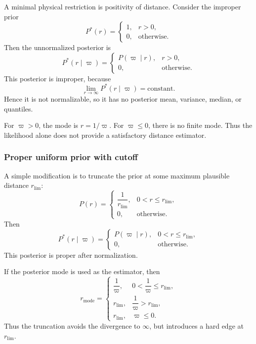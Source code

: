 \documentclass[11pt, titlepage]{article} %
\numberwithin{equation}{section}
\theoremstyle{definition}
\numberwithin{assumption}{section}
\begin{document}
A minimal physical restriction is positivity of distance. Consider the improper prior
\begin{equation*}
    P^*(r)=
    \begin{cases}
        1, & r>0,\\
        0, & \text{otherwise}.
    \end{cases}
\end{equation*}
Then the unnormalized posterior is
\begin{equation*}
    P^*(r\mid \varpi)=
    \begin{cases}
        P(\varpi\mid r), & r>0,\\
        0, & \text{otherwise}.
    \end{cases}
\end{equation*}
This posterior is improper, because
\begin{equation*}
    \lim_{r\to\infty} P^*(r\mid \varpi)=\text{constant}.
\end{equation*}
Hence it is not normalizable, so it has no posterior mean, variance, median, or quantiles.

For $\varpi>0$, the mode is $r=1/\varpi$. For $\varpi\le 0$, there is no finite mode. Thus the likelihood alone does not provide a satisfactory distance estimator.

\subsubsection*{Proper uniform prior with cutoff}

A simple modification is to truncate the prior at some maximum plausible distance $r_{\mathrm{lim}}$:
\begin{equation*}
    P(r)=
    \begin{cases}
        \dfrac{1}{r_{\mathrm{lim}}}, & 0<r\le r_{\mathrm{lim}},\\
        0, & \text{otherwise}.
    \end{cases}
\end{equation*}
Then
\begin{equation*}
    P^*(r\mid \varpi)=
    \begin{cases}
        P(\varpi\mid r), & 0<r\le r_{\mathrm{lim}},\\
        0, & \text{otherwise}.
    \end{cases}
\end{equation*}
This posterior is proper after normalization.

If the posterior mode is used as the estimator, then
\begin{equation*}
    r_{\mathrm{mode}}=
    \begin{cases}
        \dfrac{1}{\varpi}, & 0<\dfrac{1}{\varpi}\le r_{\mathrm{lim}},\\[1ex]
        r_{\mathrm{lim}}, & \dfrac{1}{\varpi}>r_{\mathrm{lim}},\\[0.5ex]
        r_{\mathrm{lim}}, & \varpi\le 0.
    \end{cases}
\end{equation*}
Thus the truncation avoids the divergence to $\infty$, but introduces a hard edge at $r_{\mathrm{lim}}$.
\end{document}
